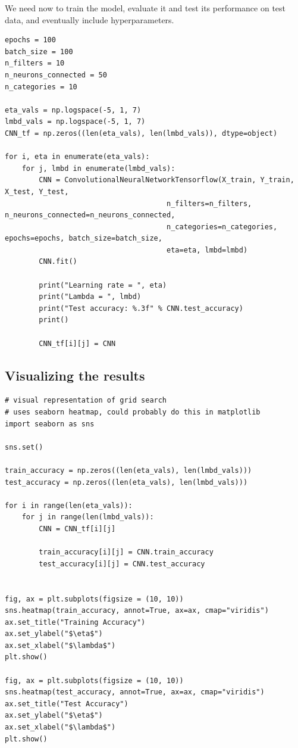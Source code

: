 \documentclass[%
oneside,                 %
final,                   %
10pt]{article}
\begin{document}
We need now to train the model, evaluate it and test its performance on test data, and eventually include hyperparameters.
\begin{verbatim}
epochs = 100
batch_size = 100
n_filters = 10
n_neurons_connected = 50
n_categories = 10

eta_vals = np.logspace(-5, 1, 7)
lmbd_vals = np.logspace(-5, 1, 7)
CNN_tf = np.zeros((len(eta_vals), len(lmbd_vals)), dtype=object)
        
for i, eta in enumerate(eta_vals):
    for j, lmbd in enumerate(lmbd_vals):
        CNN = ConvolutionalNeuralNetworkTensorflow(X_train, Y_train, X_test, Y_test,
                                      n_filters=n_filters, n_neurons_connected=n_neurons_connected,
                                      n_categories=n_categories, epochs=epochs, batch_size=batch_size,
                                      eta=eta, lmbd=lmbd)
        CNN.fit()
        
        print("Learning rate = ", eta)
        print("Lambda = ", lmbd)
        print("Test accuracy: %.3f" % CNN.test_accuracy)
        print()
            
        CNN_tf[i][j] = CNN
\end{verbatim}

\subsection*{Visualizing the results}

\begin{verbatim}
# visual representation of grid search
# uses seaborn heatmap, could probably do this in matplotlib
import seaborn as sns

sns.set()

train_accuracy = np.zeros((len(eta_vals), len(lmbd_vals)))
test_accuracy = np.zeros((len(eta_vals), len(lmbd_vals)))

for i in range(len(eta_vals)):
    for j in range(len(lmbd_vals)):
        CNN = CNN_tf[i][j]

        train_accuracy[i][j] = CNN.train_accuracy
        test_accuracy[i][j] = CNN.test_accuracy

        
fig, ax = plt.subplots(figsize = (10, 10))
sns.heatmap(train_accuracy, annot=True, ax=ax, cmap="viridis")
ax.set_title("Training Accuracy")
ax.set_ylabel("$\eta$")
ax.set_xlabel("$\lambda$")
plt.show()

fig, ax = plt.subplots(figsize = (10, 10))
sns.heatmap(test_accuracy, annot=True, ax=ax, cmap="viridis")
ax.set_title("Test Accuracy")
ax.set_ylabel("$\eta$")
ax.set_xlabel("$\lambda$")
plt.show()
\end{verbatim}
\end{document}
